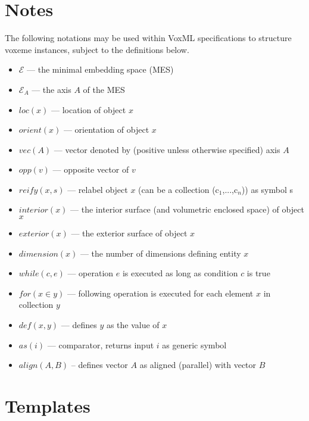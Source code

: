 \documentclass[10pt, a4paper]{article}
\begin{document}
\section{Notes}

The following notations may be used within VoxML specifications to structure voxeme instances, subject to the definitions below.

\begin{itemize}
\item $\mathcal{E}$ --- the minimal embedding space (MES)
\item $\mathcal{E}_A$ --- the axis $A$ of the MES
\item $loc(x)$ --- location of object $x$
\item $orient(x)$ --- orientation of object $x$
\item $vec(A)$ --- vector denoted by (positive unless otherwise specified) axis $A$
\item $opp(v)$ --- opposite vector of $v$
\item $reify(x,s)$ --- relabel object $x$ (can be a collection (c$_1$,...,c$_n$)) as symbol s
\item $interior(x)$ --- the interior surface (and volumetric enclosed space) of object $x$
\item $exterior(x)$ --- the exterior surface of object $x$
\item $dimension(x)$ --- the number of dimensions defining entity $x$
\item $while(c,e)$ --- operation $e$ is executed as long as condition $c$ is true
\item $for(x \in y)$ --- following operation is executed for each element $x$ in collection $y$
\item $def(x,y)$ --- defines $y$ as the value of $x$
\item $as(i)$ --- comparator, returns input $i$ as generic symbol
\item $align(A,B)$ -- defines vector $A$ as aligned (parallel) with vector $B$
\end{itemize}

\section{Templates}
\end{document}
